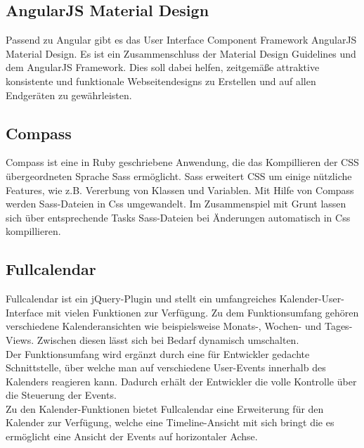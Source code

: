 \subsection{AngularJS Material Design}
Passend zu Angular gibt es das User Interface Component Framework AngularJS Material Design. Es ist ein Zusammenschluss der Material Design Guidelines und dem AngularJS Framework. Dies soll dabei helfen, zeitgemäße attraktive konsistente und funktionale  Webseitendesigns zu Erstellen und auf allen Endgeräten zu gewährleisten.

\subsection{Compass}
Compass ist eine in Ruby geschriebene Anwendung, die das Kompillieren der CSS übergeordneten Sprache Sass ermöglicht.
Sass erweitert CSS um einige nützliche Features, wie z.B. Vererbung von Klassen und Variablen. Mit Hilfe von Compass werden Sass-Dateien in Css umgewandelt.
Im Zusammenspiel mit Grunt lassen sich über entsprechende Tasks Sass-Dateien bei Änderungen automatisch in Css kompillieren.

\subsection{Fullcalendar}
Fullcalendar ist ein jQuery-Plugin und stellt ein umfangreiches Kalender-User-Interface mit vielen Funktionen zur Verfügung. Zu dem Funktionsumfang gehören verschiedene Kalenderansichten wie beispielsweise Monats-, Wochen- und Tages-Views. Zwischen diesen lässt sich bei Bedarf dynamisch umschalten.\\
Der Funktionsumfang wird ergänzt durch eine für Entwickler gedachte Schnittstelle, über welche man auf verschiedene User-Events innerhalb des Kalenders reagieren kann. Dadurch erhält der Entwickler die volle Kontrolle über die Steuerung der Events.\\
Zu den Kalender-Funktionen bietet Fullcalendar eine Erweiterung für den Kalender zur Verfügung, welche eine Timeline-Ansicht mit sich bringt die es ermöglicht eine Ansicht der Events auf horizontaler Achse.

